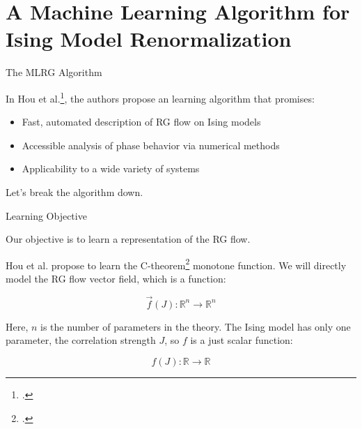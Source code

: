 \documentclass[aspectratio=169, 12pt]{beamer}
\begin{document}
\section{A Machine Learning Algorithm for Ising Model Renormalization}

\begin{frame}{The MLRG Algorithm}

    In Hou et al.\footcite{mlrg}, the authors propose an learning algorithm that promises:
    \begin{itemize}
        \item Fast, automated description of RG flow on Ising models
        \item Accessible analysis of phase behavior via numerical methods
        \item Applicability to a wide variety of systems
    \end{itemize}

    Let's break the algorithm down. 
    
\end{frame}

\begin{frame}{Learning Objective}

    Our objective is to learn a representation of the RG flow. 

    \vspace{1em}

    Hou et al. propose to learn the C-theorem\footcite{c-theorem} monotone function. We will directly model the RG flow vector field, which is a function:
    
    \[
    \vec{f}(J) : \mathbb{R}^n \rightarrow \mathbb{R}^n
    \]

    Here, $n$ is the number of parameters in the theory. 
    The Ising model has only one parameter, the correlation strength $J$, so $f$ is a just scalar function:

    \[
    f(J) : \mathbb{R} \rightarrow \mathbb{R}
    \]
    
\end{frame}
\end{document}
